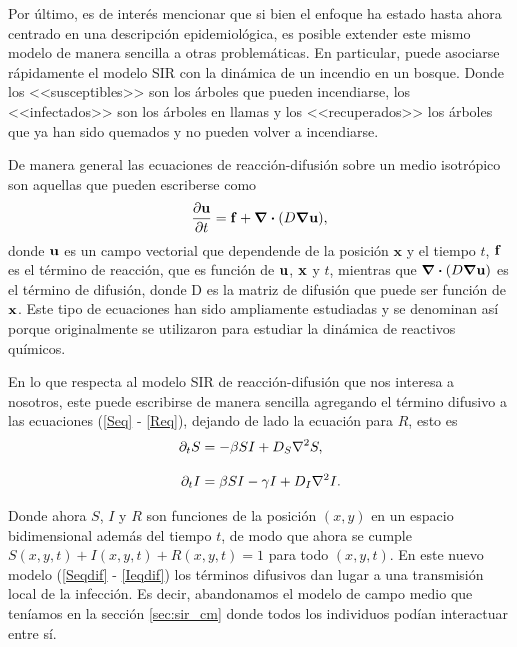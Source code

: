 Por último, es de interés mencionar que si bien el enfoque ha estado hasta ahora centrado en una descripción epidemiológica, es posible extender este 
mismo modelo de manera sencilla a otras problemáticas. En particular, puede asociarse rápidamente el modelo SIR con la dinámica
de un incendio en un bosque. Donde los <<susceptibles>> son los árboles que pueden incendiarse, los <<infectados>> son los árboles en 
llamas y los <<recuperados>> los árboles que ya han sido quemados y no pueden volver a incendiarse.
 


De manera general las ecuaciones de reacción-difusión sobre un medio isotrópico son aquellas que pueden escriberse como
\begin{equation}
  \pdv{\vb{u}}{t} = \vb{f} + \div(D\grad{\vb{u}}),
\end{equation}
donde $\vb{u}$ es un campo vectorial que dependende de la posición $\mathbf{x}$ y el tiempo $t$, $\vb{f}$ es el término de reacción, que es función de 
$\vb u$, $\vb x$ y $t$, mientras que $\div(D\grad{\vb{u}})$ es el término de difusión, donde D es la matriz de difusión que puede ser función de $\vb x$.
Este tipo de ecuaciones han sido ampliamente estudiadas \cite{keeling:infectious_diseases,Murray2002,Murray2003,crank1979mathematics} y se denominan así porque originalmente 
se utilizaron para estudiar la dinámica de reactivos químicos.\cite{turing52the}

En lo que respecta al modelo SIR de reacción-difusión que nos interesa a nosotros, este puede escribirse de manera sencilla agregando 
el término difusivo a las ecuaciones (\ref{Seq} - \ref{Req}), dejando de lado la ecuación para $R$, esto es 
\begin{align}
  \partial_t S &=-\beta SI + D_{S} \laplacian{S},\label{Seqdif}\\[.3cm]
  \partial_t I &=\beta SI - \gamma I + D_{I} \laplacian{I}.\label{Ieqdif}
\end{align}

Donde ahora $S$, $I$ y $R$ son funciones de la posición $(x,y)$ en un espacio bidimensional además del tiempo $t$, de modo que ahora 
se cumple $S(x,y,t)+I(x,y,t)+R(x,y,t)=1$ para todo $(x,y,t)$. En este nuevo modelo 
(\ref{Seqdif} - \ref{Ieqdif}) los términos difusivos dan lugar a una transmisión local de la infección. Es decir, abandonamos 
el modelo de campo medio que teníamos en la sección \ref{sec:sir_cm} donde todos los individuos podían interactuar entre sí.

